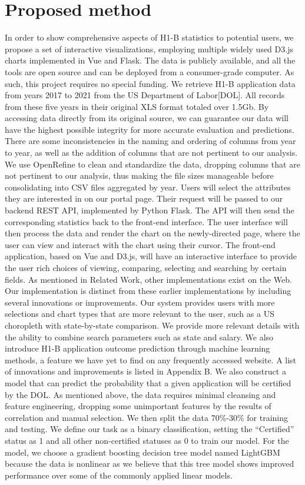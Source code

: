 \documentclass[sigconf]{acmart}
\begin{document}
\section{Proposed method}
In order to show comprehensive aspects of H1-B statistics to potential users, we propose a set of interactive visualizations, 
employing multiple widely used D3.js charts implemented in Vue and Flask.  The data is publicly available, and all the tools 
are open source and can be deployed from a consumer-grade computer. As such, this project requires no special funding.
We retrieve H1-B application data from years 2017 to 2021 from the US Department of Labor[DOL]. All records from these five 
years in their original XLS format totaled over 1.5Gb. By accessing data directly from its original source, we can guarantee 
our data will have the highest possible integrity for more accurate evaluation and predictions. There are some inconsistencies 
in the naming and ordering of columns from year to year, as well as the addition of columns that are not pertinent to 
our analysis.  We use OpenRefine to clean and standardize the data, dropping columns that are not pertinent to our 
analysis, thus making the file sizes manageable before consolidating into CSV files aggregated by year. 
Users will select the attributes they are interested in on our portal page. Their request will be passed to our 
backend REST API, implemented by Python Flask. The API will then send the corresponding statistics back to the 
front-end interface. The user interface will then process the data and render the chart on the newly-directed page, 
where the user can view and interact with the chart using their cursor. The front-end application, based on Vue and D3.js, 
will have an interactive interface to provide the user rich choices of viewing, comparing, selecting and searching by certain fields. 
As mentioned in Related Work, other implementations exist on the Web. Our implementation is distinct from these earlier 
implementations by including several innovations or improvements. Our system provides users with more selections and 
chart types that are more relevant to the user, such as a US choropleth with state-by-state comparison. 
We provide more relevant details with the ability to combine search parameters such as state and salary. 
We also introduce H1-B application outcome prediction through machine learning methods, a feature we have yet to find on 
any frequently accessed website. A list of innovations and improvements is listed in Appendix B. We also construct 
a model that can predict the probability that a given application will be certified by the DOL. 
As mentioned above, the data requires minimal cleansing and feature engineering, dropping some unimportant features 
by the results of correlation and manual selection. We then split the data 70\%-30\% for training and testing. 
We define our task as a binary classification, setting the “Certified” status as 1 and all other non-certified statuses 
as 0 to train our model. For the model, we choose a gradient boosting decision tree model named LightGBM because the data 
is nonlinear as we believe that this tree model shows improved performance over some of the commonly applied linear models. 
\end{document}
